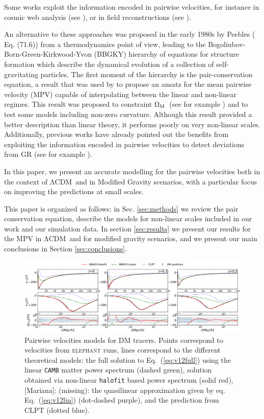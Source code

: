 \documentclass[%
 reprint,
groupedaddress,
nofootinbib,
nobibnotes,
 amsmath,amssymb,
 aps,
]{revtex4-2}
\newcommand{\code}[1]{{\texttt{#1}}}
\newcommand{\refeq}[1]{Eq.~(\ref{eq:#1})}
\newcommand{\Om}{$\Omega_{\rm M}$}
\newcommand{\lcdm}{$\mathrm{\Lambda CDM}$}
\newcommand{\elephant}{\textsc{elephant}}
\newcommand{\<}{\langle}
\renewcommand{\>}{\rangle}
\newcommand{\MJ}[1]{\textcolor{WildStrawberry}{[Mariana]: #1}}
\begin{document}
Some works exploit the information encoded in pairwise velocities, for instance in cosmic web analysis (see \cite{2012MNRAS.425.2049H}), or in field reconstructions (see \cite{2023MNRAS.522.5291G, 2021MNRAS.507.1557L}).  

An alternative to these approaches was proposed in the early 1980s by Peebles (\cite{1980lssu.book} Eq. (71.6)) from a thermodynamics point of view, leading to the Bogoliubov-Born-Green-Kirkwood-Yvon (BBGKY) hierarchy of equations for structure formation which describe the dynamical evolution of a collection of self-gravitating particles. The first moment of the hierarchy is the pair-conservation equation, a result that was used by \cite{Juszkiewicz_1999} to propose an ansatz for the mean pairwise velocity (MPV) capable of interpolating between the linear and non-linear regimes.
%
This result was proposed to constraint \Om\-\ (see for example \cite{2000Sci...287..109J}) and to test some models including non-zero curvature. Although this result provided a better description than linear theory, it performs poorly on very non-linear scales. 
%
Additionally, previous works have already pointed out the benefits from exploiting the information encoded in pairwise velocities to detect deviations from GR (see for example \cite{2014PhRvL.112v1102H}). 

In this paper, we present an accurate modelling for the pairwise velocities both in the context of \lcdm\-\ and in Modified Gravity scenarios, with a particular focus on improving the predictions at small scales. 

This paper is organized as follows: in Sec. \ref{sec:methods} we review the pair conservation equation, describe the models for non-linear scales included in our work and our simulation data. 
In section \ref{sec:results} we present our results for the MPV in \lcdm\-\ and for modified gravity scenarios, and we present our main conclusions in Section \ref{sec:conclusions}. 

\begin{figure}
\includegraphics[width=\textwidth]{figs/fig1_v2.pdf}
\caption{\label{fig:v12_model_comparison} Pairwise velocities models for DM tracers. Points correspond to velocities from \elephant{} runs, lines correspond to the different theoretical models: the full solution to \refeq{v12full} using  the linear \code{CAMB} matter power spectrum (dashed green), solution obtained via non-linear \code{halofit} based power spectrum  (solid red), \MJ{(missing): the quasilinear approximation given by eq. \refeq{v12lin} (dot-dashed purple)}, and the prediction from CLPT (dotted blue).}
\end{figure}
 
\end{document}
